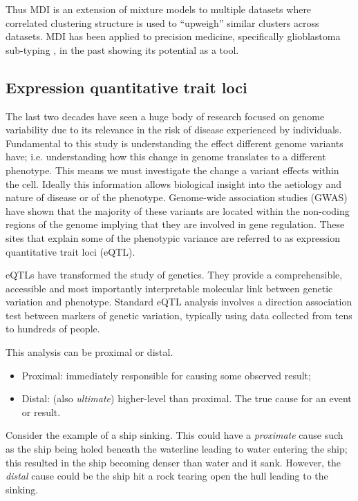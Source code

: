 \documentclass[11pt]{article} %
\begin{document}
	Thus MDI is an extension of mixture models to multiple datasets where correlated clustering structure is used to ``upweigh'' similar clusters across datasets. MDI has been applied to precision medicine, specifically glioblastoma sub-typing \cite{savage_identifying_2013}, in the past showing its potential as a tool.
	
	\subsection{Expression quantitative trait loci}
	The last two decades have seen a huge body of research focused on genome variability due to its 
	relevance in the risk of disease experienced by individuals. Fundamental to this study is 
	understanding the effect different genome variants have; i.e. understanding how this change 
	in genome translates to a different phenotype. This means we must investigate the change a 
	variant effects within the cell. Ideally this information allows biological insight into the 
	aetiology and nature of disease or of the phenotype. Genome-wide association studies (GWAS) 
	\cite{feero_genomewide_2010} have shown that the majority of these variants are located within 
	the non-coding regions of the genome \cite{nica_expression_2013} implying that they are involved in gene regulation. These 
	sites that explain some of the phenotypic variance are referred to as expression quantitative 
	trait loci (eQTL).
	
	eQTLs have transformed the study of genetics. They provide a comprehensible, accessible and 
	most importantly interpretable molecular link between genetic variation and phenotype. Standard 
	eQTL analysis involves a direction association test between markers of genetic variation, 
	typically using data collected from tens to hundreds of people.
	
	This analysis can be proximal or distal.
	\begin{itemize}
		\item Proximal: immediately responsible for causing some observed result;
		\item Distal: (also \emph{ultimate}) higher-level than proximal. The true cause for an event or 
		result.
	\end{itemize}
	Consider the example of a ship sinking. This could have a \emph{proximate} cause such as the ship 
	being holed beneath the waterline leading to water entering the ship; this resulted in the ship 
	becoming denser than water and it sank. However, the \emph{distal} cause could be the ship hit a 
	rock tearing open the hull leading to the sinking.
	
\end{document}
